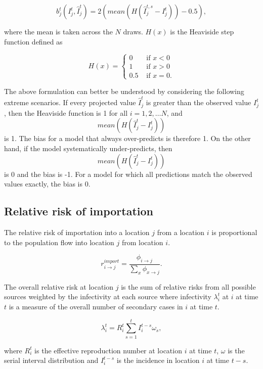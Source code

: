 \documentclass[9pt,twocolumn,twoside,lineno]{pnas-new}
\begin{document}
{\begin{equation*}
b_{j}^{t}(I_{j}^{t}, \hat{I}_{j}^{t}) = 
2 \left( mean \left( H \left (\hat{I}_{j}^{t, s} - I_{j}^{t} \right)
\right) - 0.5 \right),
\end{equation*}

where the mean is taken across the \(N\) draws. \(H(x)\) is the Heaviside
step function defined as

\begin{equation*}
H(x) = \begin{cases} 
0 & \text{ if } x < 0 \\ 
1 & \text{ if } x > 0 \\
0.5 & \text{ if } x = 0. 
\end{cases} 
\end{equation*}

The above formulation can better be understood by considering the
following extreme scenarios. If every projected value
$\hat{I}_{j}^{t}$ is greater than the observed value
$I_{j}^{t}$, then the Heaviside function is 1 for all $i = 1, 2,
\dots N$, and 
\[ mean\left( H \left( \hat{I}_{j}^{t} - I_j^t \right) \right) \]
is 1. The bias for a model that always over-predicts
is therefore 1. On the other hand, if the model systematically
under-predicts, then
\[ mean\left( H \left( \hat{I}_{j}^{t} - I_j^t \right) \right) \]
is 0 and the bias is -1. For a model for which all
predictions match the observed values exactly, the bias is 0.


\subsection*{Relative risk of importation}\label{relative-risk-of-importation}

The relative risk of importation into a location \(j\) from a location
\(i\) is proportional to the population flow into location \(j\) from
location \(i\).

\[
  r_{i \rightarrow j}^{import} = \frac{\phi_{i \rightarrow j}}{\sum_{x}{\phi_{x \rightarrow j}}}.
\]

The overall relative risk at location \(j\) is the sum of relative risks
from all possible sources weighted by the infectivity at each source
where infectivity \(\lambda_{i}^{t}\) at \(i\) at time \(t\) is a
measure of the overall number of secondary cases in \(i\) at time \(t\).

\[
  \lambda_{i}^{t} = R_{i}^{t} \sum_{s =1}^{t} {I_{i}^{t - s}\omega_{s}},
  \]

where \(R_{i}^{t}\) is the effective reproduction number at location
\(i\) at time \(t\), \(\omega\) is the serial interval distribution and
\(I_{i}^{t - s}\) is the incidence in location \(i\) at time \(t - s\).

}
\end{document}
